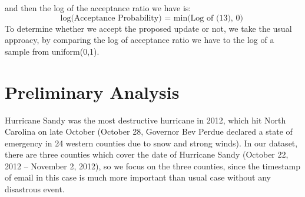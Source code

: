\documentclass[a4paper]{article}
\begin{document}
	and then the log of the acceptance ratio we have is:
		\begin{equation}
		\mbox{log(Acceptance Probability) = min(Log of (13), 0) }
			\end{equation}
To determine whether we accept the proposed update or not, we take the usual approacy, by comparing the log of acceptance ratio we have to the log of a sample from uniform(0,1).
\section{Preliminary Analysis}
Hurricane Sandy was the most destructive hurricane in 2012, which hit North Carolina on late October (October 28, Governor Bev Perdue declared a state of emergency in 24 western counties due to snow and strong winds). In our dataset, there are three counties which cover the date of Hurricane Sandy (October 22, 2012 – November 2, 2012), so we focus on the three counties, since the timestamp of email in this case is much more important than usual case without any disastrous event.
\end{document}
